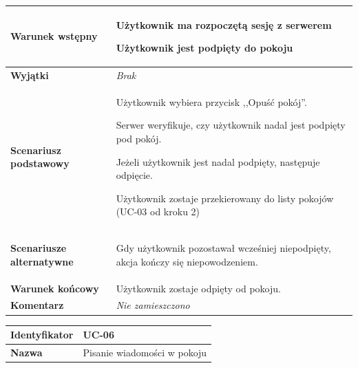 {\begin{tabular}{ | l | l | }
	\hline
		\textbf{Warunek wstępny} & \parbox[t]{11cm}{
			\begin{enumreq}
				\item Użytkownik ma rozpoczętą sesję z serwerem
				\item Użytkownik jest podpięty do pokoju
			\end{enumreq}

		}
		\\

	\hline
		\textbf{Wyjątki} & \parbox[t]{11cm}{
			\textit{Brak}
		}
		\\

	\hline
		\textbf{Scenariusz podstawowy} & \parbox[t]{11cm}{
			\begin{enumreq}
				\item Użytkownik wybiera przycisk ,,Opuść pokój''.
				\item Serwer weryfikuje, czy użytkownik nadal jest podpięty pod pokój.
				\item Jeżeli użytkownik jest nadal podpięty, następuje odpięcie.
				\item Użytkownik zostaje przekierowany do listy pokojów (UC-03 od kroku
				2)
			\end{enumreq}
		}
		\\

	\hline
		\textbf{Scenariusze alternatywne} & \parbox[t]
		{11cm}{
			\begin{enumreq}
				\item Gdy użytkownik pozostawał wcześniej niepodpięty, akcja kończy się
				niepowodzeniem.
			\end{enumreq}
		}
		\\

	\hline
		\textbf{Warunek końcowy} & \parbox[t]{11cm}{
			Użytkownik zostaje odpięty od pokoju.
		}
		\\

	\hline
		\textbf{Komentarz} & \parbox[t]{11cm}{
			\textit{Nie zamieszczono}
		}
		\\

	\hline
\end{tabular}

\vspace{2em}

\begin{tabular}{ | l | l | }
	\hline
		\textbf{Identyfikator} &
		UC-06
		\\

	\hline
		\textbf{Nazwa} &
		Pisanie wiadomości w pokoju
		\\


\end{tabular}}
